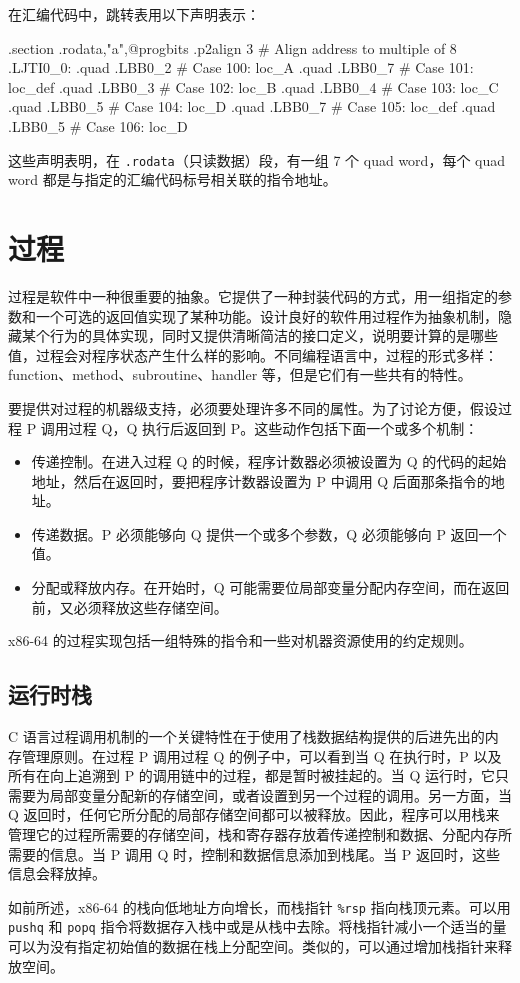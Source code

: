 在汇编代码中，跳转表用以下声明表示：
\begin{gascode}
    .section    .rodata,"a",@progbits
    .p2align    3       # Align address to multiple of 8
.LJTI0_0:
    .quad   .LBB0_2     # Case 100: loc_A
    .quad   .LBB0_7     # Case 101: loc_def
    .quad   .LBB0_3     # Case 102: loc_B
    .quad   .LBB0_4     # Case 103: loc_C
    .quad   .LBB0_5     # Case 104: loc_D
    .quad   .LBB0_7     # Case 105: loc_def
    .quad   .LBB0_5     # Case 106: loc_D
\end{gascode}
这些声明表明，在 \verb|.rodata|（只读数据）段，有一组 7 个 quad word，每个 quad word 都是与指定的汇编代码标号相关联的指令地址。

\section{过程}

过程是软件中一种很重要的抽象。它提供了一种封装代码的方式，用一组指定的参数和一个可选的返回值实现了某种功能。设计良好的软件用过程作为抽象机制，隐藏某个行为的具体实现，同时又提供清晰简洁的接口定义，说明要计算的是哪些值，过程会对程序状态产生什么样的影响。不同编程语言中，过程的形式多样：function、method、subroutine、handler 等，但是它们有一些共有的特性。

要提供对过程的机器级支持，必须要处理许多不同的属性。为了讨论方便，假设过程 P 调用过程 Q，Q 执行后返回到 P。这些动作包括下面一个或多个机制：
\begin{itemize}
    \item 传递控制。在进入过程 Q 的时候，程序计数器必须被设置为 Q 的代码的起始地址，然后在返回时，要把程序计数器设置为 P 中调用 Q 后面那条指令的地址。
    \item 传递数据。P 必须能够向 Q 提供一个或多个参数，Q 必须能够向 P 返回一个值。
    \item 分配或释放内存。在开始时，Q 可能需要位局部变量分配内存空间，而在返回前，又必须释放这些存储空间。
\end{itemize}

x86-64 的过程实现包括一组特殊的指令和一些对机器资源使用的约定规则。

\subsection{运行时栈}

C 语言过程调用机制的一个关键特性在于使用了栈数据结构提供的后进先出的内存管理原则。在过程 P 调用过程 Q 的例子中，可以看到当 Q 在执行时，P 以及所有在向上追溯到 P 的调用链中的过程，都是暂时被挂起的。当 Q 运行时，它只需要为局部变量分配新的存储空间，或者设置到另一个过程的调用。另一方面，当 Q 返回时，任何它所分配的局部存储空间都可以被释放。因此，程序可以用栈来管理它的过程所需要的存储空间，栈和寄存器存放着传递控制和数据、分配内存所需要的信息。当 P 调用 Q 时，控制和数据信息添加到栈尾。当 P 返回时，这些信息会释放掉。

如前所述，x86-64 的栈向低地址方向增长，而栈指针 \verb|%rsp| 指向栈顶元素。可以用 \verb|pushq| 和 \verb|popq| 指令将数据存入栈中或是从栈中去除。将栈指针减小一个适当的量可以为没有指定初始值的数据在栈上分配空间。类似的，可以通过增加栈指针来释放空间。

\endinput
